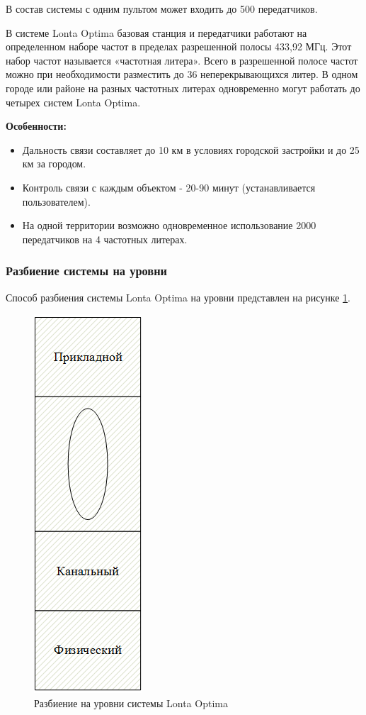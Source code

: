 В состав системы с одним пультом может входить до 500 передатчиков.

В системе Lonta Optima базовая станция и передатчики работают на определенном наборе частот в пределах разрешенной полосы 433,92 МГц. Этот набор частот называется «частотная литера». Всего в разрешенной полосе частот можно при необходимости разместить до 36 неперекрывающихся литер.
В одном городе или районе на разных частотных литерах одновременно могут работать до четырех систем Lonta Optima.

\textbf{Особенности:}
\begin{itemize}

\item Дальность связи составляет до 10 км в условиях городской застройки и до 25 км за городом.
\item Контроль связи с каждым объектом - 20-90 минут (устанавливается пользователем).
\item На одной территории возможно одновременное использование 2000 передатчиков на 4 частотных литерах.
\end{itemize}

\subsubsection{Разбиение системы на уровни}
Способ разбиения системы  Lonta Optima на уровни представлен на рисунке
\ref{fig:system_levels}.
\begin{figure}[H]
	\centering\includegraphics[width=0.2\linewidth]{img/system_levels}
	\caption{Разбиение на уровни системы Lonta Optima}
	\label{fig:system_levels}
\end{figure}

